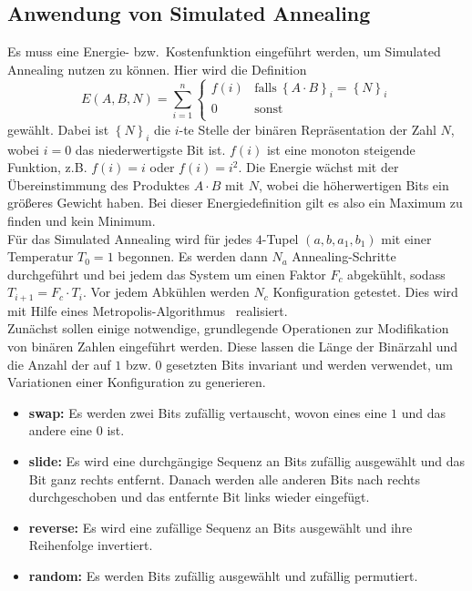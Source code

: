 \subsection{Anwendung von Simulated Annealing}
Es muss eine Energie- bzw.\ Kostenfunktion eingeführt werden, um Simulated Annealing nutzen zu können. Hier wird die Definition
\begin{equation*}
		E\left(A,B,N\right)=\sum\limits_{i=1}^n\begin{cases}
		  		f\left(i\right) & \mathrm{falls}\:{\left\{A\cdot B\right\}}_i={\left\{N\right\}}_i \\
						0 & \mathrm{sonst}\\
				\end{cases}
\end{equation*}
gewählt. Dabei ist ${\left\{N\right\}}_i$ die $i$-te Stelle der binären Repräsentation der Zahl $N$, wobei $i=0$ das niederwertigste Bit ist. $f\left(i\right)$ ist eine monoton steigende Funktion, z.B. $f\left(i\right)=i$ oder $f\left(i\right)=i^2$. Die Energie wächst mit der Übereinstimmung des Produktes $A\cdot B$ mit $N$, wobei die höherwertigen Bits ein größeres Gewicht haben. Bei dieser Energiedefinition gilt es also ein Maximum zu finden und kein Minimum. \\
Für das Simulated Annealing wird für jedes $4$-Tupel $\left(a,b,a_1,b_1\right)$ mit einer Temperatur $T_0=1$ begonnen. Es werden dann $N_a$ Annealing-Schritte durchgeführt und bei jedem das System um einen Faktor $F_c$ abgekühlt, sodass $T_{i+1}=F_c\cdot T_i$. Vor jedem Abkühlen werden $N_c$ Konfiguration getestet. Dies wird mit Hilfe eines Metropolis-Algorithmus~\parencite{metropolis} realisiert. \\
Zunächst sollen einige notwendige, grundlegende Operationen zur Modifikation von binären Zahlen eingeführt werden. Diese lassen die Länge der Binärzahl und die Anzahl der auf $1$ bzw. $0$ gesetzten Bits invariant und werden verwendet, um Variationen einer Konfiguration zu generieren.
\begin{itemize}
		\item \textbf{swap:} Es werden zwei Bits zufällig vertauscht, wovon eines eine $1$ und das andere eine $0$ ist.
		\item \textbf{slide:} Es wird eine durchgängige Sequenz an Bits zufällig ausgewählt und das Bit ganz rechts entfernt. Danach werden alle anderen Bits nach rechts durchgeschoben und das entfernte Bit links wieder eingefügt.
		\item \textbf{reverse:} Es wird eine zufällige Sequenz an Bits ausgewählt und ihre Reihenfolge invertiert.
		\item \textbf{random:} Es werden Bits zufällig ausgewählt und zufällig permutiert.
\end{itemize}
